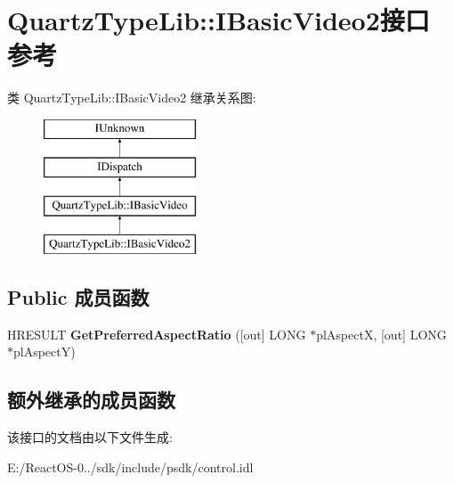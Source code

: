 \hypertarget{interface_quartz_type_lib_1_1_i_basic_video2}{}\section{Quartz\+Type\+Lib\+:\+:I\+Basic\+Video2接口 参考}
\label{interface_quartz_type_lib_1_1_i_basic_video2}
类 Quartz\+Type\+Lib\+:\+:I\+Basic\+Video2 继承关系图\+:\begin{figure}[H]
\begin{center}
\leavevmode
\includegraphics[height=4.000000cm]{interface_quartz_type_lib_1_1_i_basic_video2}
\end{center}
\end{figure}
\subsection*{Public 成员函数}
\begin{DoxyCompactItemize}
\item 
\mbox{\label{interface_quartz_type_lib_1_1_i_basic_video2_ab5fe408544468ddfbca438ed897d2684}} 
H\+R\+E\+S\+U\+LT {\bfseries Get\+Preferred\+Aspect\+Ratio} (\mbox{[}out\mbox{]} L\+O\+NG $\ast$pl\+AspectX, \mbox{[}out\mbox{]} L\+O\+NG $\ast$pl\+AspectY)
\end{DoxyCompactItemize}
\subsection*{额外继承的成员函数}


该接口的文档由以下文件生成\+:\begin{DoxyCompactItemize}
\item 
E\+:/\+React\+O\+S-\/0../sdk/include/psdk/control.\+idl\end{DoxyCompactItemize}
